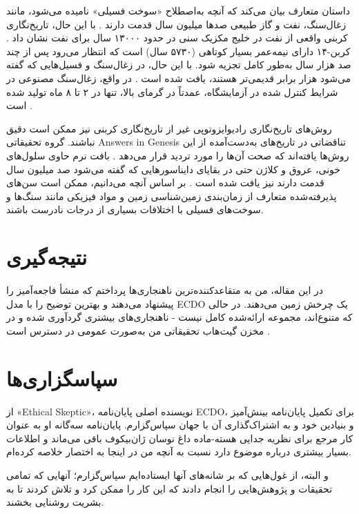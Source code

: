 \documentclass[10pt,twocolumn,letterpaper]{article}
\begin{document}
داستان متعارف بیان می‌کند که آنچه به‌اصطلاح «سوخت فسیلی» نامیده می‌شود، مانند زغال‌سنگ، نفت و گاز طبیعی صدها میلیون سال قدمت دارند \cite{104}. با این حال، تاریخ‌نگاری کربنی واقعی از نفت در خلیج مکزیک سنی در حدود ۱۳۰۰۰ سال برای نفت نشان داد \cite{105}. کربن-۱۴ دارای نیمه‌عمر بسیار کوتاهی (۵۷۳۰ سال) است که انتظار می‌رود پس از چند صد هزار سال به‌طور کامل تجزیه شود. با این حال، در زغال‌سنگ و فسیل‌هایی که گفته می‌شود هزار برابر قدیمی‌تر هستند، یافت شده است \cite{106}. در واقع، زغال‌سنگ مصنوعی در شرایط کنترل شده در آزمایشگاه، عمدتاً در گرمای بالا، تنها در ۲ تا ۸ ماه تولید شده است \cite{107}.

روش‌های تاریخ‌نگاری رادیوایزوتوپی غیر از تاریخ‌نگاری کربنی نیز ممکن است دقیق نباشند. گروه تحقیقاتی Answers in Genesis تناقضاتی در تاریخ‌های به‌دست‌آمده از این روش‌ها یافته‌اند که صحت آن‌ها را مورد تردید قرار می‌دهد \cite{108}. بافت نرم حاوی سلول‌های خونی، عروق و کلاژن حتی در بقایای دایناسورهایی که گفته می‌شود صد میلیون سال قدمت دارند نیز یافت شده است \cite{109,110}. بر اساس آنچه می‌دانیم، ممکن است سن‌های پذیرفته‌شده متعارف از زمان‌بندی زمین‌شناسی زمین و مواد فیزیکی مانند سنگ‌ها و سوخت‌های فسیلی با اختلافات بسیاری از درجات نادرست باشند.

\section{نتیجه‌گیری}

در این مقاله، من به متقاعدکننده‌ترین ناهنجاری‌ها پرداختم که منشأ فاجعه‌آمیز را پیشنهاد می‌دهند و بهترین توضیح را با مدل ECDO یک چرخش زمین می‌دهند. در حالی که متنوع‌اند، مجموعه ارائه‌شده کامل نیست - ناهنجاری‌های بیشتری گردآوری شده و در مخزن گیت‌هاب تحقیقاتی من به‌صورت عمومی در دسترس است \cite{2}.

\section{سپاسگزاری‌ها}

از «Ethical Skeptic»، نویسنده اصلی پایان‌نامه ECDO، برای تکمیل پایان‌نامه بینش‌آمیز و بنیادین خود و به اشتراک‌گذاری آن با جهان سپاس‌گزارم. پایان‌نامه سه‌گانه او \cite{1} به عنوان کار مرجع برای نظریه جدایی هسته-ماده داغ نوسان ژان‌بیکوف باقی می‌ماند و اطلاعات بسیار بیشتری درباره موضوع دارد نسبت به آنچه من در اینجا به اختصار خلاصه کرده‌ام.

و البته، از غول‌هایی که بر شانه‌های آنها ایستاده‌ایم سپاس‌گزارم؛ آنهایی که تمامی تحقیقات و پژوهش‌هایی را انجام دادند که این کار را ممکن کرد و تلاش کردند تا به بشریت روشنایی بخشند.

{\small


}
\end{document}
